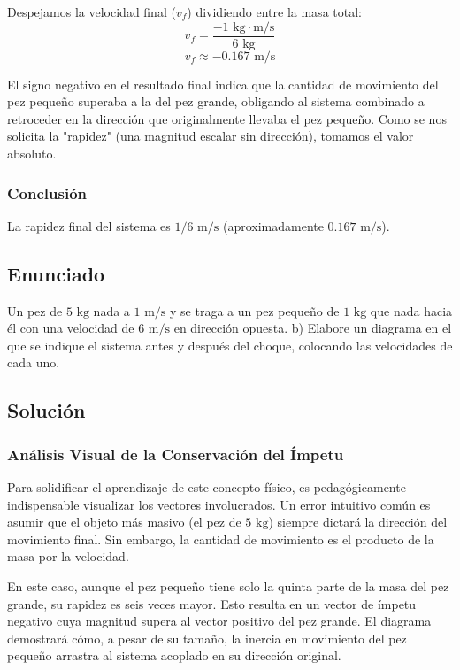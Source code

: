 \documentclass{article}
\begin{document}
Despejamos la velocidad final ($v_f$) dividiendo entre la masa total:
$$v_f = \frac{-1 \text{ kg}\cdot\text{m/s}}{6 \text{ kg}}$$
$$v_f \approx -0.167 \text{ m/s}$$

El signo negativo en el resultado final indica que la cantidad de movimiento del pez pequeño superaba a la del pez grande, obligando al sistema combinado a retroceder en la dirección que originalmente llevaba el pez pequeño. Como se nos solicita la "rapidez" (una magnitud escalar sin dirección), tomamos el valor absoluto.

\subsubsection*{Conclusión}
La rapidez final del sistema es $1/6 \text{ m/s}$ (aproximadamente $0.167 \text{ m/s}$).

\newpage

\subsection*{Enunciado}
Un pez de $5 \text{ kg}$ nada a $1 \text{ m/s}$ y se traga a un pez pequeño de $1 \text{ kg}$ que nada hacia él con una velocidad de $6 \text{ m/s}$ en dirección opuesta. 
b) Elabore un diagrama en el que se indique el sistema antes y después del choque, colocando las velocidades de cada uno.

\subsection*{Solución}

\subsubsection*{Análisis Visual de la Conservación del Ímpetu}
Para solidificar el aprendizaje de este concepto físico, es pedagógicamente indispensable visualizar los vectores involucrados. Un error intuitivo común es asumir que el objeto más masivo (el pez de $5 \text{ kg}$) siempre dictará la dirección del movimiento final. Sin embargo, la cantidad de movimiento es el producto de la masa por la velocidad. 

En este caso, aunque el pez pequeño tiene solo la quinta parte de la masa del pez grande, su rapidez es seis veces mayor. Esto resulta en un vector de ímpetu negativo cuya magnitud supera al vector positivo del pez grande. El diagrama demostrará cómo, a pesar de su tamaño, la inercia en movimiento del pez pequeño arrastra al sistema acoplado en su dirección original.
\end{document}
